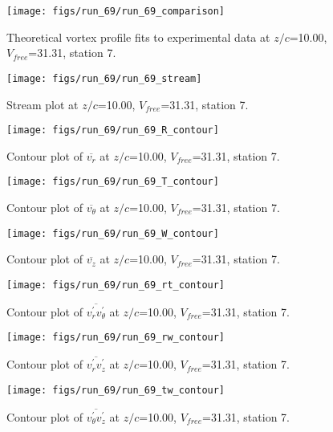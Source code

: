 \begin{figure}[H]
\centering
\texttt{[image: figs/run\_69/run\_69\_comparison]}
\caption{Theoretical vortex profile fits to experimental data at $z/c$=10.00, $V_{free}$=31.31, station 7.}
\end{figure}


\begin{figure}[H]
\centering
\texttt{[image: figs/run\_69/run\_69\_stream]}
\caption{Stream plot at $z/c$=10.00, $V_{free}$=31.31, station 7.}
\end{figure}


\begin{figure}[H]
\centering
\texttt{[image: figs/run\_69/run\_69\_R\_contour]}
\caption{Contour plot of $\overline{v_{r}}$ at $z/c$=10.00, $V_{free}$=31.31, station 7.}
\end{figure}


\begin{figure}[H]
\centering
\texttt{[image: figs/run\_69/run\_69\_T\_contour]}
\caption{Contour plot of $\overline{v_{\theta}}$ at $z/c$=10.00, $V_{free}$=31.31, station 7.}
\end{figure}


\begin{figure}[H]
\centering
\texttt{[image: figs/run\_69/run\_69\_W\_contour]}
\caption{Contour plot of $\overline{v_{z}}$ at $z/c$=10.00, $V_{free}$=31.31, station 7.}
\end{figure}


\begin{figure}[H]
\centering
\texttt{[image: figs/run\_69/run\_69\_rt\_contour]}
\caption{Contour plot of $\overline{v_{r}^{\prime} v_{\theta}^{\prime}}$ at $z/c$=10.00, $V_{free}$=31.31, station 7.}
\end{figure}


\begin{figure}[H]
\centering
\texttt{[image: figs/run\_69/run\_69\_rw\_contour]}
\caption{Contour plot of $\overline{v_{r}^{\prime} v_{z}^{\prime}}$ at $z/c$=10.00, $V_{free}$=31.31, station 7.}
\end{figure}


\begin{figure}[H]
\centering
\texttt{[image: figs/run\_69/run\_69\_tw\_contour]}
\caption{Contour plot of $\overline{v_{\theta}^{\prime} v_{z}^{\prime}}$ at $z/c$=10.00, $V_{free}$=31.31, station 7.}
\end{figure}


